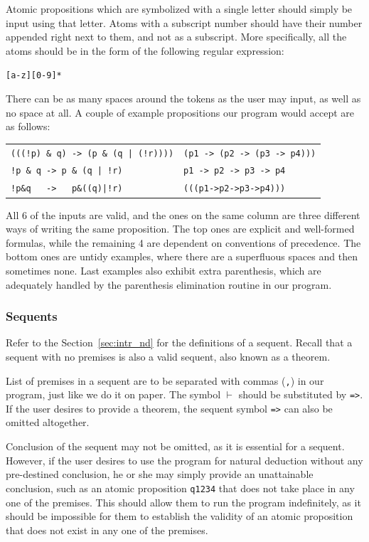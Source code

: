 \documentclass[12pt]{article}
\begin{document}
Atomic propositions which are symbolized with a single letter should simply
be input using that letter. Atoms with a subscript number should have their
number appended right next to them, and not as a subscript. More specifically,
all the atoms should be in the form of the following regular expression:

\begin{center}
\verb|[a-z][0-9]*|
\end{center}

There can be as many spaces around the tokens as the user may input,
as well as no space at all. A couple of example propositions our program
would accept are as follows:

\begin{center}
	\begin{tabular}{l | l}
		\verb^(((!p) & q) -> (p & (q | (!r))))^ & \verb^(p1 -> (p2 -> (p3 -> p4)))^\\
		\verb^!p & q -> p & (q | !r)^           & \verb^p1 -> p2 -> p3 -> p4^\\
		\verb^!p&q   ->   p&((q)|!r)^           & \verb^(((p1->p2->p3->p4)))^
	\end{tabular}
\end{center}

All 6 of the inputs are valid, and the ones on the same column are
three different ways of writing the same proposition. The top ones are
explicit and well-formed formulas, while the remaining 4 are dependent
on conventions of precedence. The bottom ones are untidy examples, where
there are a superfluous spaces and then sometimes none. Last examples
also exhibit extra parenthesis, which are adequately handled by the
parenthesis elimination routine in our program.

\subsubsection{Sequents}

Refer to the Section~\ref{sec:intr_nd} for the definitions of a sequent.
Recall that a sequent with no premises is also a valid sequent, also known
as a theorem.

List of premises in a sequent are to be separated with commas (\verb|,|)
in our program, just like we do it on paper. The symbol $\vdash$ should
be substituted by \verb|=>|.  If the user desires to provide a theorem,
the sequent symbol \verb|=>| can also be omitted altogether.

Conclusion of the sequent may not be omitted, as it is essential for a
sequent. However, if the user desires to use the program for natural deduction
without any pre-destined conclusion, he or she may simply provide an unattainable
conclusion, such as an atomic proposition \verb|q1234| that does not take place
in any one of the premises. This should allow them to run the program
indefinitely, as it should be impossible for them to establish the validity
of an atomic proposition that does not exist in any one of the premises.
\end{document}

